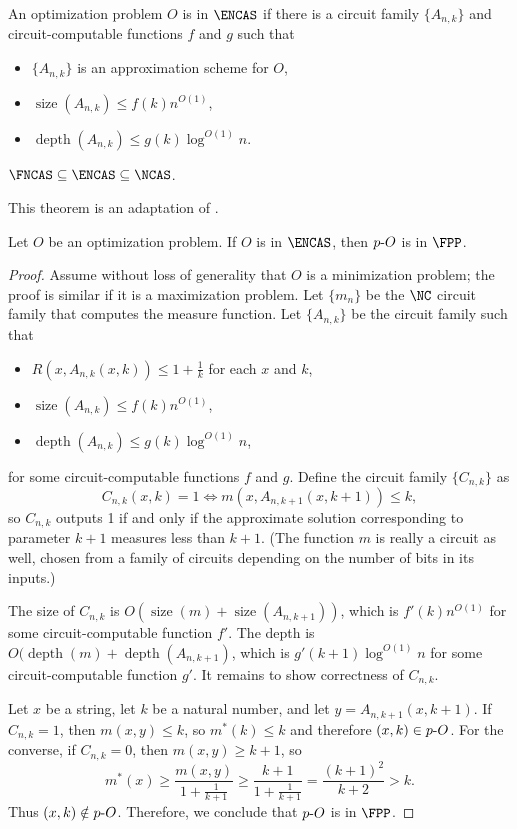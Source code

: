 \documentclass{article}
\newcommand{\dash}{\textnormal{-}}
\DeclareMathOperator{\depth}{depth}
\DeclareMathOperator{\size}{size}
\begin{document}
\begin{definition}
  An optimization problem $O$ is in $\ENCAS$ if there is a circuit family $\{A_{n, k}\}$ and circuit-computable functions $f$ and $g$ such that
  \begin{itemize}
  \item $\{A_{n, k}\}$ is an approximation scheme for $O$,
  \item $\size(A_{n, k}) \leq f(k) n^{O(1)}$,
  \item $\depth(A_{n, k}) \leq g(k) \log^{O(1)} n$.
  \end{itemize}
\end{definition}

\begin{proposition}\label{prop:encas}
  $\FNCAS \subseteq \ENCAS \subseteq \NCAS$.
\end{proposition}

This theorem is an adaptation of \autocite[Theorem~1.32]{fg06}.

\begin{theorem}\label{thm:encasfpp}
  Let $O$ be an optimization problem.
  If $O$ is in $\ENCAS$, then $p\dash{O}$ is in $\FPP$.
\end{theorem}
\begin{proof}
  Assume without loss of generality that $O$ is a minimization problem; the proof is similar if it is a maximization problem.
  Let $\{m_n\}$ be the $\NC$ circuit family that computes the measure function.
  Let $\{A_{n, k}\}$ be the circuit family such that
  \begin{itemize}
  \item $R(x, A_{n, k}(x, k)) \leq 1 + \frac{1}{k}$ for each $x$ and $k$,
  \item $\size(A_{n, k}) \leq f(k) n^{O(1)}$,
  \item $\depth(A_{n, k}) \leq g(k) \log^{O(1)} n$,
  \end{itemize}
  for some circuit-computable functions $f$ and $g$.
  Define the circuit family $\{C_{n, k}\}$ as
  \[
  C_{n, k}(x, k) = 1 \iff m(x, A_{n, k + 1}(x, k + 1)) \leq k,
  \]
  so $C_{n, k}$ outputs 1 if and only if the approximate solution corresponding to parameter $k + 1$ measures less than $k + 1$.
  (The function $m$ is really a circuit as well, chosen from a family of circuits depending on the number of bits in its inputs.)

  The size of $C_{n, k}$ is $O(\size(m) + \size(A_{n, k + 1}))$, which is $f'(k)n^{O(1)}$ for some circuit-computable function $f'$.
  The depth is $O(\depth(m) + \depth(A_{n, k + 1})$, which is $g'(k + 1) \log^{O(1)} n$ for some circuit-computable function $g'$.
  It remains to show correctness of $C_{n, k}$.

  Let $x$ be a string, let $k$ be a natural number, and let $y = A_{n, k + 1}(x, k + 1)$.
  If $C_{n, k} = 1$, then $m(x, y) \leq k$, so $m^*(k) \leq k$ and therefore $(x, k) \in p \dash O$.
  For the converse, if $C_{n, k} = 0$, then $m(x, y) \geq k + 1$, so
  \[
  m^*(x) \geq \frac{m(x, y)}{1 + \frac{1}{k + 1}} \geq \frac{k + 1}{1 + \frac{1}{k + 1}} = \frac{(k + 1)^2}{k + 2} > k.
  \]
  Thus $(x, k) \notin p \dash O$.
  Therefore, we conclude that $p \dash O$ is in $\FPP$.
\end{proof}
\end{document}
